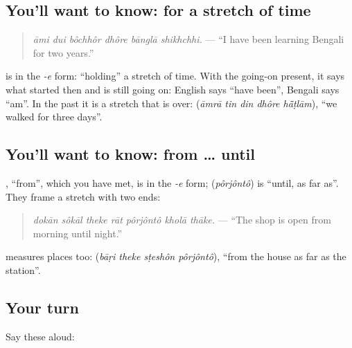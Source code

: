 \subsection*{You'll want to know: for a stretch of time}
\begin{quote}
\textbf{     }
\end{quote}

\begin{quote}
\emph{āmi dui bôchhôr dhôre bānglā shikhchhi.} — \textquotedblleft{}I have been learning Bengali for two years.\textquotedblright{}
\end{quote}

\textbf{} is \textbf{} in the \emph{-e} form: \textquotedblleft{}holding\textquotedblright{} a stretch of time. With the going-on present, it says what started then and is still going on: English says \textquotedblleft{}have been\textquotedblright{}, Bengali says \textquotedblleft{}am\textquotedblright{}. In the past it is a stretch that is over: \textbf{    } (\emph{āmrā tin din dhôre hā̃ṭlām}), \textquotedblleft{}we walked for three days\textquotedblright{}.

\subsection*{You'll want to know: from … until}
\textbf{}, \textquotedblleft{}from\textquotedblright{}, which you have met, is \textbf{} in the \emph{-e} form; \textbf{} (\emph{pôrjôntô}) is \textquotedblleft{}until, as far as\textquotedblright{}. They frame a stretch with two ends:

\begin{quote}
\textbf{      }
\end{quote}

\begin{quote}
\emph{dokān sôkāl theke rāt pôrjôntô kholā thāke.} — \textquotedblleft{}The shop is open from morning until night.\textquotedblright{}
\end{quote}

\textbf{} measures places too: \textbf{   } (\emph{bāṛi theke sṭeshôn pôrjôntô}), \textquotedblleft{}from the house as far as the station\textquotedblright{}.

\subsection*{Your turn}
Say these aloud:

